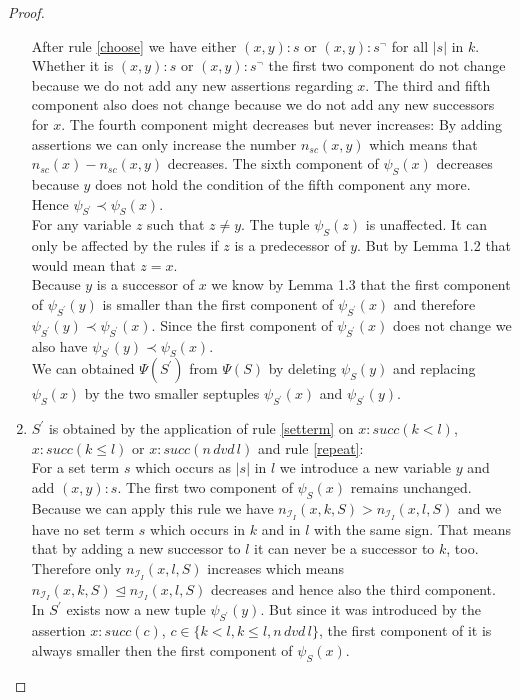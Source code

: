 \documentclass[a4paper,11pt]{scrartcl}
\theoremstyle{break}
\theoremstyle{definition}
\begin{document}
\begin{proof}
\begin{enumerate}
After rule \ref{choose} we have either $(x,y):s$ or $(x,y):s^\neg$ for all $|s|$ in $k$. Whether it is $(x,y):s$ or $(x,y):s^\neg$ the first two component do not change because we do not add any new assertions regarding $x$. The third and fifth component also does not change because we do not add any new successors for $x$. The fourth component might decreases but never increases: By adding assertions we can only increase the number $n_{sc}(x,y)$ which means that $n_{sc}(x)-n_{sc}(x,y)$ decreases. The sixth component of $\psi_S(x)$ decreases because $y$ does not hold the condition of the fifth component any more.  Hence $\psi_{S^\prime}\prec\psi_S(x)$.\\ 
For any variable $z$ such that $z\neq y$. The tuple $\psi_S(z)$ is unaffected. It can only be affected by the rules if $z$ is a predecessor of $y$. But by Lemma 1.2 that would mean that $z=x$.\\
Because $y$ is a successor of $x$ we know by Lemma 1.3 that the first component of $\psi_{S^\prime}(y)$ is smaller than the first component of $\psi_{S^\prime}(x)$ and therefore $\psi_{S^\prime}(y)\prec\psi_{S^\prime}(x)$. Since the first component of $\psi_{S^\prime}(x)$ does not change we also have $\psi_{S^\prime}(y)\prec\psi_{S}(x)$.\\
We can obtained $\Psi(S^\prime)$ from $\Psi(S)$ by deleting $\psi_S(y)$ and replacing $\psi_S(x)$ by the two smaller septuples $\psi_{S^\prime}(x)$ and $\psi_{S^\prime}(y)$.
\item $S^\prime$ is obtained by the application of rule \ref{setterm} on $x:succ(k<l)$, $x:succ(k\leq l)$ or $x:succ(n\,dvd\,l)$ and rule \ref{repeat}:\\ 
For a set term $s$ which occurs as $|s|$ in $l$ we introduce a new variable $y$ and add $(x,y):s$. The first two component of $\psi_S(x)$ remains unchanged. Because we can apply this rule we have $n_{\mathcal{I}_I}(x,k,S)>n_{\mathcal{I}_I}(x,l,S)$ and we have no set term $s$ which occurs in $k$ and in $l$ with the same sign. That means that by adding a new successor to $l$ it can never be a successor to $k$, too. Therefore only $n_{\mathcal{I}_I}(x,l,S)$ increases which means $n_{\mathcal{I}_I}(x,k,S)\unlhd n_{\mathcal{I}_I}(x,l,S)$ decreases and hence also the third component.\\
In $S^\prime$ exists now a new tuple $\psi_{S^\prime}(y)$. But since it was introduced by the assertion $x:succ(c)$, $c\in\{k<l,k\leq l,n\,dvd\,l\}$, the first component of it is always smaller then the first component of $\psi_S(x)$.\\

\end{enumerate}
\end{proof}
\end{document}
